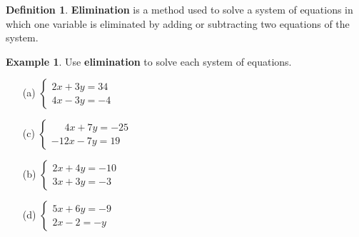 \documentclass{report}
\theoremstyle{definition}
\newtheorem{example}{\bf Example}
\newtheorem{definition}{\bf Definition}[section]
\begin{document}
 \begin{definition}
\textbf{Elimination} is a method used to solve a system of equations in which one variable is eliminated by adding or subtracting two equations of the system.
 \end{definition}

\begin{example}
     Use \textbf{elimination} to solve each system of equations.
\end{example}
%
\vspace{-0.5cm}
\hspace{-0.5cm}
%
\begin{minipage}{0.45\linewidth}
 \begin{itemize}
     \item[(a)]
        $\begin{cases}
            2x+3y=34 \\
            4x-3y=-4
        \end{cases}$\\
 \end{itemize}
%
\vspace{2.75cm}
%
 \begin{itemize}
     \item[(c)]
        $\begin{cases}
            \quad \,\, 4x+7y=-25 \\
            -12x-7y=19
        \end{cases}$\\
 \end{itemize}
%
\vspace{2.75cm}
%
\end{minipage}
\hspace{1.5cm}
\begin{minipage}{0.45\linewidth}
 \begin{itemize}
     \item[(b)]
        $\begin{cases}
            2x+4y=-10 \\
            3x+3y=-3
        \end{cases}$\\
 \end{itemize}
%
\vspace{2.75cm}
%
 \begin{itemize}
     \item[(d)]
        $\begin{cases}
            5x+6y=-9 \\
            2x-2=-y
        \end{cases}$\\
 \end{itemize}
%
\vspace{2.75cm}
%
\end{minipage}
\vfill
\noindent {}
\end{document}
